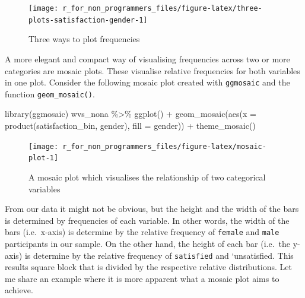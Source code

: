 \documentclass[
]{book}
\newenvironment{Shaded}{\begin{snugshade}}{\end{snugshade}}
\newcommand{\AttributeTok}[1]{\textcolor[rgb]{0.77,0.63,0.00}{#1}}
\newcommand{\FunctionTok}[1]{\textcolor[rgb]{0.00,0.00,0.00}{#1}}
\newcommand{\NormalTok}[1]{#1}
\newcommand{\SpecialCharTok}[1]{\textcolor[rgb]{0.00,0.00,0.00}{#1}}
\begin{document}
\begin{figure}

{\centering \texttt{[image: r\_for\_non\_programmers\_files/figure-latex/three-plots-satisfaction-gender-1]} 

}

\caption{Three ways to plot frequencies}\label{fig:three-plots-satisfaction-gender}
\end{figure}

A more elegant and compact way of visualising frequencies across two or more categories are mosaic plots. These visualise relative frequencies for both variables in one plot. Consider the following mosaic plot created with \texttt{ggmosaic} and the function \texttt{geom\_mosaic()}.

\begin{Shaded}
\begin{Highlighting}[]
\FunctionTok{library}\NormalTok{(ggmosaic)}
\NormalTok{wvs\_nona }\SpecialCharTok{\%\textgreater{}\%}
  \FunctionTok{ggplot}\NormalTok{() }\SpecialCharTok{+}
  \FunctionTok{geom\_mosaic}\NormalTok{(}\FunctionTok{aes}\NormalTok{(}\AttributeTok{x =} \FunctionTok{product}\NormalTok{(satisfaction\_bin, gender),}
                            \AttributeTok{fill =}\NormalTok{ gender)) }\SpecialCharTok{+} 
  \FunctionTok{theme\_mosaic}\NormalTok{()}
\end{Highlighting}
\end{Shaded}

\begin{figure}

{\centering \texttt{[image: r\_for\_non\_programmers\_files/figure-latex/mosaic-plot-1]} 

}

\caption{A mosaic plot which visualises the relationship of two categorical variables}\label{fig:mosaic-plot}
\end{figure}

From our data it might not be obvious, but the height and the width of the bars is determined by frequencies of each variable. In other words, the width of the bars (i.e.~x-axis) is determine by the relative frequency of \texttt{female} and \texttt{male} participants in our sample. On the other hand, the height of each bar (i.e.~the y-axis) is determine by the relative frequency of \texttt{satisfied} and `unsatisfied. This results square block that is divided by the respective relative distributions. Let me share an example where it is more apparent what a mosaic plot aims to achieve.
\end{document}
